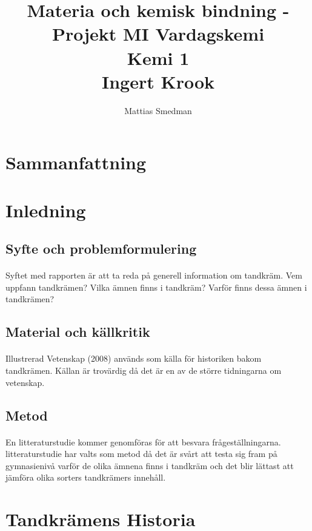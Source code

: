 \documentclass[12pt]{article}
\title{Materia och kemisk bindning - Projekt MI Vardagskemi \\ Kemi 1 \\ Ingert Krook}
\author{Mattias Smedman}
\begin{document}
	\maketitle
	\newpage
	\section*{Sammanfattning}
	\newpage
	\tableofcontents
	\newpage
	
	\section{Inledning}
		\subsection{Syfte och problemformulering}
			\paragraph{}Syftet med rapporten är att ta reda på generell information om tandkräm. Vem uppfann tandkrämen? Vilka ämnen finns i tandkräm? Varför finns dessa ämnen i tandkrämen?
			
		\subsection{Material och källkritik}
			\paragraph{}Illustrerad Vetenskap (2008) används som källa för historiken bakom tandkrämen. Källan är trovärdig då det är en av de större tidningarna om vetenskap.

		\subsection{Metod}
			\paragraph{}En litteraturstudie kommer genomföras för att besvara frågeställningarna. litteraturstudie har valts som metod då det är svårt att testa sig fram på gymnasienivå varför de olika ämnena finns i tandkräm och det blir lättast att jämföra olika sorters tandkrämers innehåll.

	\section{Tandkrämens Historia}
\end{document}
